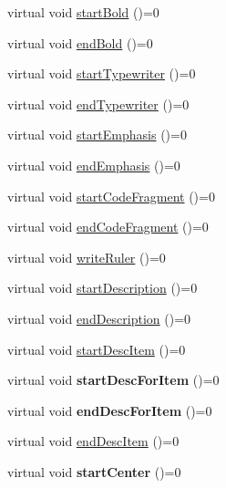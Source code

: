 \begin{DoxyCompactItemize}
\item 
virtual void \hyperlink{class_base_output_doc_interface_a9ad34c5f6672948732a87c4371d2e244}{start\-Bold} ()=0
\item 
virtual void \hyperlink{class_base_output_doc_interface_a593e371dace7c16866f8bd028905096d}{end\-Bold} ()=0
\item 
virtual void \hyperlink{class_base_output_doc_interface_ae241cdb69ca06cd0a539dd8b8a0a419f}{start\-Typewriter} ()=0
\item 
virtual void \hyperlink{class_base_output_doc_interface_a201cdc35ada3fac3f2f72adcc43308b8}{end\-Typewriter} ()=0
\item 
virtual void \hyperlink{class_base_output_doc_interface_afa6a6472913a05d8524804a27aebb56c}{start\-Emphasis} ()=0
\item 
virtual void \hyperlink{class_base_output_doc_interface_a1530746d5ac62d305ff693f0eb2bf90a}{end\-Emphasis} ()=0
\item 
virtual void \hyperlink{class_base_output_doc_interface_a649cecde411897cea447f103795d8c64}{start\-Code\-Fragment} ()=0
\item 
virtual void \hyperlink{class_base_output_doc_interface_a6d0e9c89b22affd8574d3804393d8fa5}{end\-Code\-Fragment} ()=0
\item 
virtual void \hyperlink{class_base_output_doc_interface_a5f36f83289e2b6137e9086998c5fb883}{write\-Ruler} ()=0
\item 
virtual void \hyperlink{class_base_output_doc_interface_a90167ae571c0685acd7934fde582ca7b}{start\-Description} ()=0
\item 
virtual void \hyperlink{class_base_output_doc_interface_a58e5aab2220d1da0e75a66c294cc9857}{end\-Description} ()=0
\item 
virtual void \hyperlink{class_base_output_doc_interface_a5392dc059a26e9c650ffee7d28636f74}{start\-Desc\-Item} ()=0
\item 
\hypertarget{class_base_output_doc_interface_ad0a455f0a2344f6188cde8de697b4433}{virtual void {\bfseries start\-Desc\-For\-Item} ()=0}\label{class_base_output_doc_interface_ad0a455f0a2344f6188cde8de697b4433}

\item 
\hypertarget{class_base_output_doc_interface_a737810958e3c17f65d06050a4d96515a}{virtual void {\bfseries end\-Desc\-For\-Item} ()=0}\label{class_base_output_doc_interface_a737810958e3c17f65d06050a4d96515a}

\item 
virtual void \hyperlink{class_base_output_doc_interface_ae9e2fe1d39b02fcc5a682ace36d7eafa}{end\-Desc\-Item} ()=0
\item 
\hypertarget{class_base_output_doc_interface_a6c705372da335649a67a744d1283afaf}{virtual void {\bfseries start\-Center} ()=0}\label{class_base_output_doc_interface_a6c705372da335649a67a744d1283afaf}


\end{DoxyCompactItemize}
